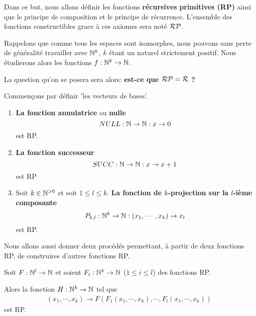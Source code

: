 Dans ce but, nous allons définir les fonctions \textbf{récursives primitives
(RP)} ainsi que le principe de composition et le principe de récurrence.
L'ensemble des fonctions constructibles grace à ces axiomes sera noté
$\mathcal{RP}$.

Rappelons que comme tous les espaces sont isomorphes, nous pouvons sans perte de
généralité travailler avec $\mathbb{N}^{k}$, $k$ étant un naturel strictement
positif. Nous étudierons alors les fonctions
$f : \mathbb{N}^{k} \rightarrow \mathbb{N}$.

\vspace{5mm}

La question qu'on se posera sera alors: \textbf{est-ce que
$\mathcal{RP} = \mathcal{R}$ ?}

\vspace{5mm}

Commençons par définir 'les vecteurs de bases'.

\begin{enumerate}
	\item \textbf{La fonction annulatrice} ou \textbf{nulle}
		\begin{equation}
			NULL : \mathbb{N} \rightarrow \mathbb{N} : x \rightarrow 0
		\end{equation}
		est RP.
	\item \textbf{La fonction successeur}
		\begin{equation}
			SUCC : \mathbb{N} \rightarrow \mathbb{N} : x \rightarrow x + 1
		\end{equation}
		est RP
	\item Soit $k \in \mathbb{N}^{> 0}$ et soit $1 \leq l \leq k$. \textbf{La
		fonction de $k$-projection sur la $l$-ième composante}
		\begin{equation}
			P_{k, l} : \mathbb{N}^{k} \rightarrow \mathbb{N} : (x_{1}, \cdots, x_{k}) \rightarrow x_{l}
		\end{equation}
		est RP.
\end{enumerate}

\vspace{5mm}

Nous allons aussi donner deux procédés permettant, à partir de deux fonctions
RP, de construires d'autres fonctions RP.

\begin{definition} 
	Soit $F : \mathbb{N}^{l} \rightarrow \mathbb{N}$ et soient
	$F_{i} : \mathbb{N}^{k} \rightarrow \mathbb{N}$ ($1 \leq i \leq l$) des
	fonctions RP.

	Alors la fonction $H : \mathbb{N}^{k} \rightarrow \mathbb{N}$ tel que
	\begin{align}
		(x_{1}, \cdots, x_{k}) \rightarrow F(F_{1}(x_{1}, \cdots, x_{k}), \cdots, F_{l}(x_{1}, \cdots, x_{k}))
	\end{align}
	est RP.
\end{definition}

